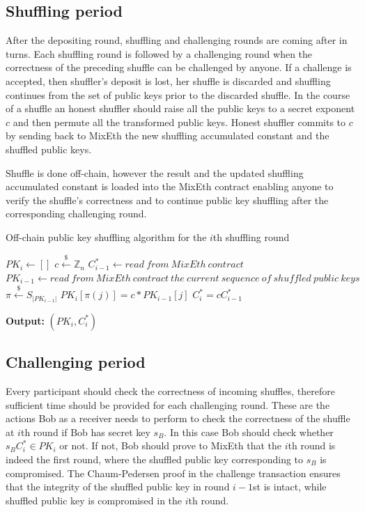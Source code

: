 \documentclass[a4paper]{article}
\theoremstyle{definition}
\begin{document}
\subsection{Shuffling period}
After the depositing round, shuffling and challenging rounds are coming after in turns. Each shuffling round is followed by a challenging round when the correctness of the preceding shuffle can be challenged by anyone. If a challenge is accepted, then shuffler's deposit is lost, her shuffle is discarded and shuffling continues from the set of public keys prior to the discarded shuffle. In the course of a shuffle an honest shuffler should raise all the public keys to a secret exponent $c$ and then permute all the transformed public keys. Honest shuffler commits to $c$ by sending back to MixEth the new shuffling accumulated constant and the shuffled public keys.

Shuffle is done off-chain, however the result and the updated shuffling accumulated constant is loaded into the MixEth contract enabling anyone to verify the shuffle's correctness and to continue public key shuffling after the corresponding challenging round.

\begin{algorithm}
\caption{Off-chain public key shuffling algorithm for the $i$th shuffling round}\label{shufflingoffchain}
\begin{algorithmic}[1]
	\State $PK_{i} \gets []$
	\State $c\stackrel{\$}{\leftarrow}\mathbb{Z}_n$
	\State $C^{*}_{i-1}\leftarrow read\ from\ MixEth\ contract$
	\State $PK_{i-1}\leftarrow read\ from\ MixEth\ contract\ the\ current\ sequence\ of\ shuffled\ public\ keys$
	\State $\pi\stackrel{\$}{\leftarrow}S_{|PK_{i-1}|}$ 
	\State $PK_{i}[\pi(j)]=c*PK_{i-1}[j]$ 
	\EndFor
	\State $C^{*}_{i}=cC^{*}_{i-1}$
	
\hspace*{\algorithmicindent} \textbf{Output:} $(PK_{i},C^{*}_{i})$ 
\end{algorithmic}   
\end{algorithm}
\subsection{Challenging period}
Every participant should check the correctness of incoming shuffles, therefore sufficient time should be provided for each challenging round. These are the actions Bob as a receiver needs to perform to check the correctness of the shuffle at $i$th round if Bob has secret key $s_{B}$. In this case Bob should check whether $s_{B}C^{*}_{i} \in PK_{i}$ or not. If not, Bob should prove to MixEth that the $i$th round is indeed the first round, where the shuffled public key corresponding to $s_{B}$ is compromised. The Chaum-Pedersen proof in the challenge transaction ensures that the integrity of the shuffled public key in round $i-1$st is intact, while shuffled public key is compromised in the $i$th round.   
\end{document}
